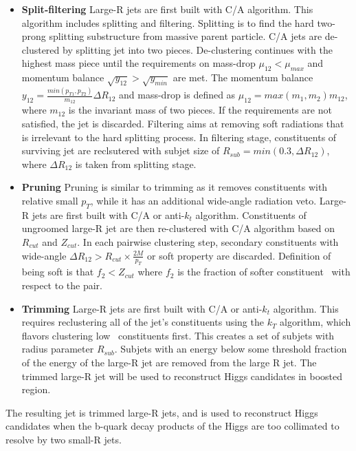 \begin{itemize}
\item \textbf{Split-filtering} Large-R jets are first built with C/A algorithm. This algorithm includes splitting and filtering. 
 Splitting is to find the hard two-prong splitting substructure from massive parent particle. C/A jets are de-clustered by splitting jet into two pieces. De-clustering continues with the highest mass piece 
 until the requirements on mass-drop $\mu_{12} < \mu_{max}$ and momentum balance $\sqrt{y_{12}} > \sqrt{y_{min}}$ are met. 
 The momentum balance $y_{12} = \frac{min(p_{T1},p_{T2})}{m_{12}}\Delta R_{12} $ and mass-drop is defined as $\mu_{12} = max(m_1,m_2) m_{12}$, where $m_{12}$ 
 is the invariant mass of two pieces. If the requirements are not satisfied, the jet is discarded. Filtering aims at removing soft radiations that is irrelevant to the hard splitting process. 
 In filtering stage, constituents of surviving jet are reclsutered with subjet size of $R_{sub} = min(0.3,\Delta R_{12})$, where $\Delta R_{12}$ is taken from splitting stage.
\item \textbf{Pruning} Pruning is similar to trimming as it removes constituents with relative small $p_T$, while it has an additional wide-angle radiation veto. Large-R jets are first built with C/A or anti-$k_t$
 algorithm. Constituents of ungroomed large-R jet are then re-clustered with C/A algorithm based on $R_{cut}$ and $Z_{cut}$. In each pairwise clustering step, secondary constituents with wide-angle 
 $\Delta R_{12} > R_{cut} \times \frac{2M}{p_T}$ or soft property are discarded. Definition of being soft is that $f_2 < Z_{cut}$ where $f_2$ is the fraction of softer constituent \pt~with respect to the pair.
\item \textbf{Trimming} Large-R jets are first built with C/A or anti-$k_t$ algorithm. This requires reclustering all of the jet’s constituents using the $k_T$ algorithm, 
 which flavors clustering low \pt~constituents first. This creates a set of subjets with radius parameter $R_{sub}$. 
 Subjets with an energy below some threshold fraction of the energy of the large-R jet are removed from the large R jet. 
 The trimmed large-R jet will be used to reconstruct Higgs candidates in boosted region.
\end{itemize}
\par The resulting jet is trimmed large-R jets, and is used to reconstruct Higgs candidates when the b-quark decay products of the Higgs are too collimated to resolve by two small-R jets.

